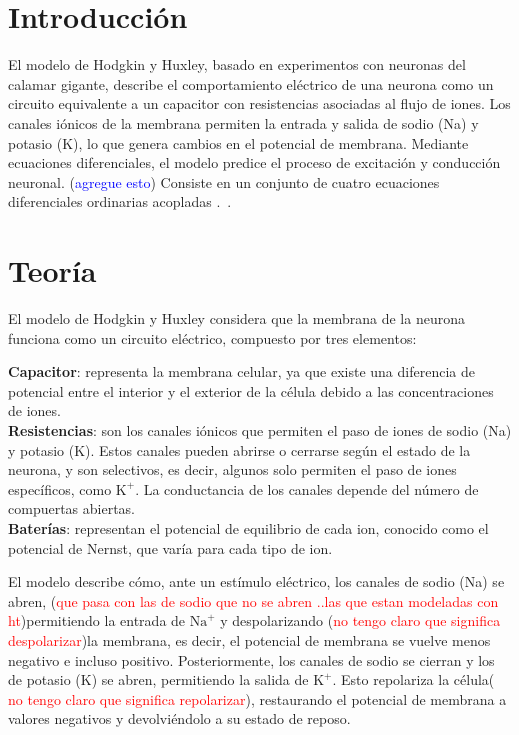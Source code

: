\documentclass[aps,prl,twocolumn,groupedaddress]{revtex4-2}
\begin{document}
\section{Introducción}

El modelo de Hodgkin y Huxley, basado en experimentos con neuronas del calamar gigante, describe el comportamiento eléctrico de una neurona como un circuito equivalente a un capacitor con resistencias asociadas al flujo de iones. Los canales iónicos de la membrana permiten la entrada y salida de sodio (Na) y potasio (K), lo que genera cambios en el potencial de membrana. Mediante ecuaciones diferenciales, el modelo predice el proceso de excitación y conducción neuronal. (\textcolor{blue}{agregue esto})
Consiste en un conjunto de cuatro ecuaciones diferenciales ordinarias acopladas .~\cite{HodgkinyHuxleyWikipedia}.
\section{Teoría}

 El modelo de Hodgkin y Huxley considera que la membrana de la neurona funciona como un circuito eléctrico, compuesto por tres elementos:

\textbf{Capacitor}: representa la membrana celular, ya que existe una diferencia de potencial entre el interior y el exterior de la célula debido a las concentraciones de iones.\\

\textbf{Resistencias}: son los canales iónicos que permiten el paso de iones de sodio (Na) y potasio (K). Estos canales pueden abrirse o cerrarse según el estado de la neurona, y son selectivos, es decir, algunos solo permiten el paso de iones específicos, como $\mathrm{K}^+$. La conductancia de los canales depende del número de compuertas abiertas.\\

\textbf{Baterías}: representan el potencial de equilibrio de cada ion, conocido como el potencial de Nernst, que varía para cada tipo de ion.

El modelo describe cómo, ante un estímulo eléctrico, los canales de sodio (Na) se abren, (\textcolor{red}{que pasa con las de sodio que no se abren ..las que estan modeladas con ht})permitiendo la entrada de $\mathrm{Na}^+$ y despolarizando (\textcolor{red}{no tengo claro que significa despolarizar})la membrana, es decir, el potencial de membrana se vuelve menos negativo e incluso positivo. Posteriormente, los canales de sodio se cierran y los de potasio (K) se abren, permitiendo la salida de $\mathrm{K}^+$. Esto repolariza la célula( \textcolor{red}{no tengo claro que significa repolarizar}), restaurando el potencial de membrana a valores negativos y devolviéndolo a su estado de reposo.
\end{document}
